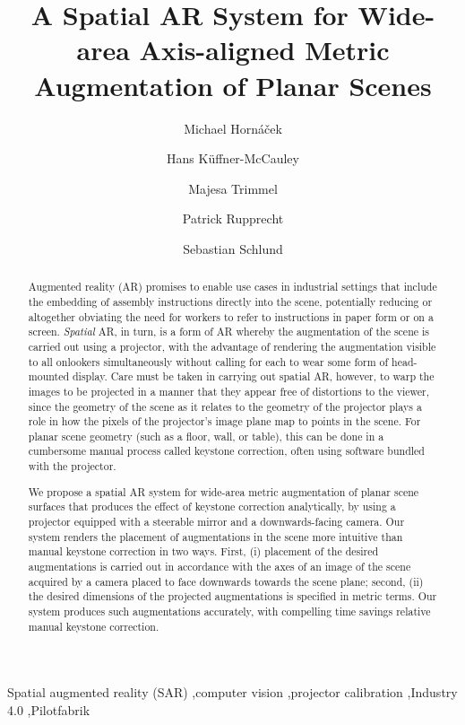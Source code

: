 \documentclass[review]{elsarticle}
\begin{document}
\begin{frontmatter}

\title{A Spatial AR System for Wide-area Axis-aligned Metric Augmentation of Planar Scenes} %

\author{Michael Horn\'{a}\v{c}ek}
\author{Hans K\"{u}ffner-McCauley}
\author{Majesa Trimmel}
\author{Patrick Rupprecht}
\author{Sebastian Schlund}
\address{Human Centered Cyber Physical Production and Assembly Systems, Institute for Management Sciences, TU Wien, Vienna, Austria}

\begin{abstract}
Augmented reality (AR) promises to enable use cases in industrial settings that include the embedding of assembly instructions directly into the scene, potentially reducing or altogether obviating the need for workers to refer to instructions in paper form or on a screen. \textit{Spatial} AR, in turn, is a form of AR whereby the augmentation of the scene is carried out using a projector, with the advantage of rendering the augmentation visible to all onlookers simultaneously without calling for each to wear some form of head-mounted display. Care must be taken in carrying out spatial AR, however, to warp the images to be projected in a manner that they appear free of distortions to the viewer, since the geometry of the scene as it relates to the geometry of the projector plays a role in how the pixels of the projector's image plane map to points in the scene. For planar scene geometry (such as a floor, wall, or table), this can be done in a cumbersome manual process called keystone correction, often using software bundled with the projector.

We propose a spatial AR system for wide-area metric augmentation of planar scene surfaces that produces the effect of keystone correction analytically, by using a projector equipped with a steerable mirror and a downwards-facing camera. Our system renders the placement of augmentations in the scene more intuitive than manual keystone correction in two ways. First, (i) placement of the desired augmentations is carried out in accordance with the axes of an image of the scene acquired by a camera placed to face downwards towards the scene plane; second, (ii) the desired dimensions of the projected augmentations is specified in metric terms. Our system produces such augmentations accurately, with compelling time savings relative manual keystone correction.
\end{abstract}

\begin{keyword}
Spatial augmented reality (SAR) \sep computer vision \sep projector calibration \sep Industry 4.0 \sep Pilotfabrik
\end{keyword}

\end{frontmatter}
\end{document}

